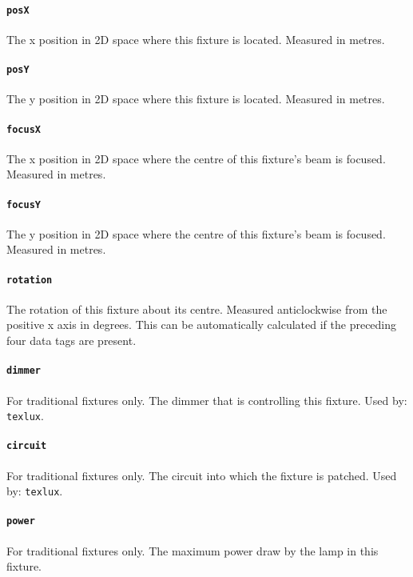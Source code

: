 \documentclass[a4paper]{article}
\begin{document}
\paragraph{\texttt{posX}}
The x position in 2D space where this fixture is located. Measured in metres.

\paragraph{\texttt{posY}}
The y position in 2D space where this fixture is located. Measured in metres.

\paragraph{\texttt{focusX}}
The x position in 2D space where the centre of this fixture's beam is 
focused. Measured in metres.

\paragraph{\texttt{focusY}}
The y position in 2D space where the centre of this fixture's beam is 
focused. Measured in metres.

\paragraph{\texttt{rotation}}
The rotation of this fixture about its centre. Measured anticlockwise from 
the positive x axis in degrees. This can be automatically calculated if the 
preceding four data tags are present.

\paragraph{\texttt{dimmer}}
For traditional fixtures only. The dimmer that is controlling this fixture. 
Used by: \texttt{texlux}.

\paragraph{\texttt{circuit}}
For traditional fixtures only. The circuit into which the fixture is patched. 
Used by: \texttt{texlux}.

\paragraph{\texttt{power}}
For traditional fixtures only. The maximum power draw by the lamp in this 
fixture.
\end{document}
